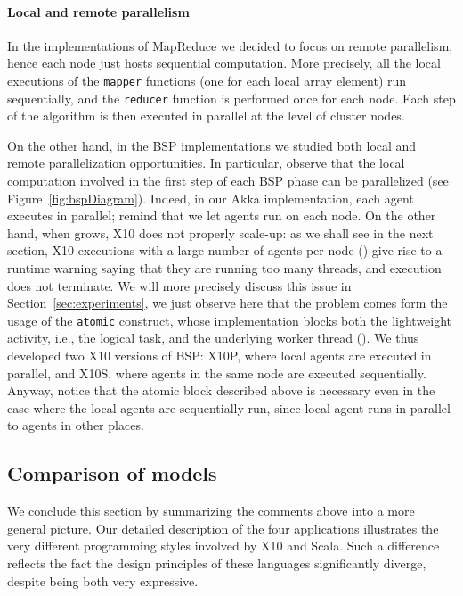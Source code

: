 \documentclass[a4paper]{article}
\numberwithin{equation}{section}
\begin{document}
\paragraph{Local and remote parallelism}
In the implementations of MapReduce we decided to focus on remote
parallelism, hence each node just hosts sequential computation. 
More precisely, all the local executions of
the \verb+mapper+ functions (one for each local array element) run
sequentially, and the \verb+reducer+ function is performed once for
each node. Each step of the algorithm is then executed in parallel at
the level of cluster nodes.
 
On the other hand, in the BSP implementations we studied
both local and remote parallelization opportunities. In particular,
observe that the local 
computation involved in the first step of each BSP phase can be
parallelized (see Figure~\ref{fig:bspDiagram}). Indeed, in our Akka
implementation, each agent executes in parallel;
remind that we let  agents run on each node.
On the other hand, when  grows, X10 does not properly scale-up:
as we shall see in the next section, X10 executions with
a large number of agents per node () give rise to a
runtime warning saying that 
they are running too many threads, and execution does not terminate. 
We will more precisely discuss this issue in
Section~\ref{sec:experiments}, we just observe here that the problem
comes form the usage of the {\tt atomic} construct, whose
implementation blocks both the lightweight
activity, i.e., the logical task, and the underlying worker thread
(\cite{X10-Brief}).
We thus developed two X10 versions of BSP:
X10P, where local agents are executed in parallel,
and X10S, where agents in the same node are executed sequentially.
Anyway, notice that the atomic block described above is necessary even
in the case where the local agents are sequentially run,  
since local agent runs in parallel to agents in other places.  




\subsection{Comparison of models}


We conclude this section by summarizing the comments above 
into a more general picture. 
Our detailed description of the four applications illustrates the very
different programming styles involved by X10 and Scala. 
Such a difference reflects the fact the design principles of these
languages significantly diverge, despite being both very expressive.
\end{document}
